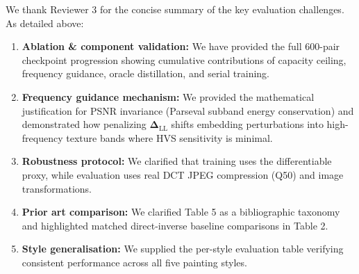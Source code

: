 \documentclass[11pt,a4paper]{article}
\begin{document}
\noindent We thank Reviewer 3 for the concise summary of the key evaluation challenges. As detailed above:
\begin{enumerate}[leftmargin=*]
\item \textbf{Ablation \& component validation:} We have provided the full 600-pair checkpoint progression showing cumulative contributions of capacity ceiling, frequency guidance, oracle distillation, and serial training.
\item \textbf{Frequency guidance mechanism:} We provided the mathematical justification for PSNR invariance (Parseval subband energy conservation) and demonstrated how penalizing $\boldsymbol{\Delta}_{\text{LL}}$ shifts embedding perturbations into high-frequency texture bands where HVS sensitivity is minimal.
\item \textbf{Robustness protocol:} We clarified that training uses the differentiable proxy, while evaluation uses real DCT JPEG compression (Q50) and image transformations.
\item \textbf{Prior art comparison:} We clarified Table 5 as a bibliographic taxonomy and highlighted matched direct-inverse baseline comparisons in Table 2.
\item \textbf{Style generalisation:} We supplied the per-style evaluation table verifying consistent performance across all five painting styles.
\end{enumerate}
\end{document}
